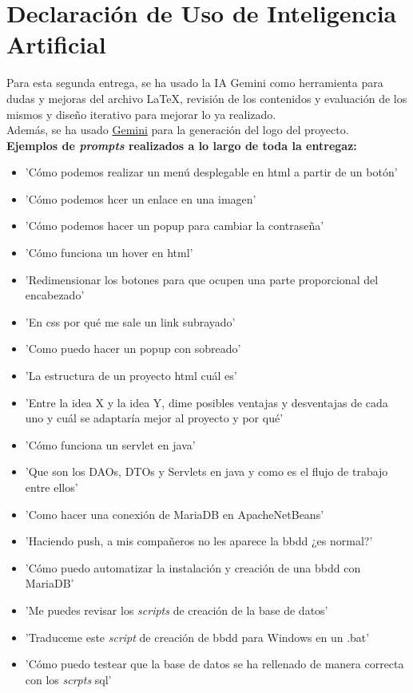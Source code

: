 \documentclass[10pt]{article}
\begin{document}
		\section{Declaración de Uso de Inteligencia Artificial}
	Para esta segunda entrega, se ha usado la IA Gemini como herramienta para dudas y mejoras del archivo LaTeX, revisión de los contenidos y evaluación de los mismos y diseño iterativo para mejorar lo ya realizado.\\
	Además, se ha usado \href{https://gemini.google.com/share/7a923a0bfae8}{Gemini} para la generación del logo del proyecto.\\
	\textbf{Ejemplos de \textit{prompts} realizados a lo largo de toda la entregaz:}
	\begin{itemize}
		\item 'Cómo podemos realizar un menú desplegable en html a partir de un botón'
		\item 'Cómo podemos hcer un enlace en una imagen'
		\item 'Cómo podemos hacer un popup para cambiar la contraseña'
		\item 'Cómo funciona un hover en html'
		\item 'Redimensionar los botones para que ocupen una parte proporcional del encabezado'
		\item 'En css por qué me sale un link subrayado'
		\item 'Como puedo hacer un popup con sobreado'
		\item 'La estructura de un proyecto html cuál es'
		\item 'Entre la idea X y la idea Y, dime posibles ventajas y desventajas de cada uno y cuál se adaptaría mejor al proyecto y por qué'
		\item 'Cómo funciona un servlet en java'
		\item 'Que son los DAOs, DTOs y Servlets en java y como es el flujo de trabajo entre ellos'
		\item 'Como hacer una conexión de MariaDB en ApacheNetBeans'
		\item 'Haciendo push, a mis compañeros no les aparece la bbdd ¿es normal?'
		\item 'Cómo puedo automatizar la instalación y creación de una bbdd con MariaDB'
		\item 'Me puedes revisar los \textit{scripts} de creación de la base de datos'
		\item 'Traduceme este \textit{script} de creación de bbdd para Windows en un .bat'
		\item 'Cómo puedo testear que la base de datos se ha rellenado de manera correcta con los \textit{scrpts} sql'

\end{itemize}
\end{document}
